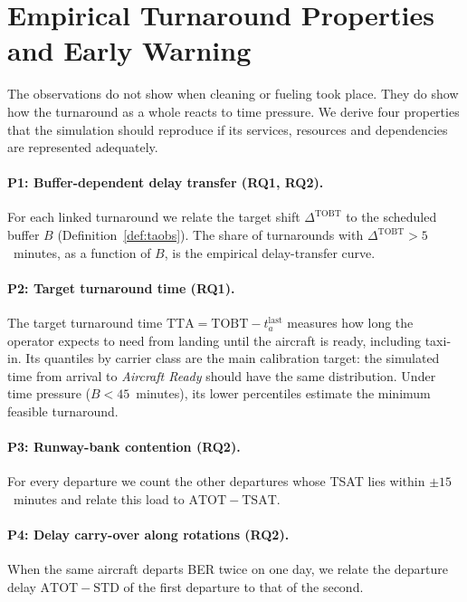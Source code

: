 \section{Empirical Turnaround Properties and Early Warning}
\label{sec:method-targets}

The observations do not show when cleaning or fueling took place. They do show how the turnaround as a whole reacts to time pressure. We derive four properties that the simulation should reproduce if its services, resources and dependencies are represented adequately.

\paragraph{P1: Buffer-dependent delay transfer (RQ1, RQ2).}
For each linked turnaround we relate the target shift $\Delta^{\mathrm{TOBT}}$ to the scheduled buffer $B$ (Definition~\ref{def:taobs}). The share of turnarounds with $\Delta^{\mathrm{TOBT}}>5$~minutes, as a function of $B$, is the empirical delay-transfer curve.

\paragraph{P2: Target turnaround time (RQ1).}
The target turnaround time $\mathrm{TTA}=\mathrm{TOBT}-t^{\mathrm{last}}_a$ measures how long the operator expects to need from landing until the aircraft is ready, including taxi-in. Its quantiles by carrier class are the main calibration target: the simulated time from arrival to \emph{Aircraft Ready} should have the same distribution. Under time pressure ($B<45$~minutes), its lower percentiles estimate the minimum feasible turnaround.

\paragraph{P3: Runway-bank contention (RQ2).}
For every departure we count the other departures whose TSAT lies within $\pm15$~minutes and relate this load to $\mathrm{ATOT}-\mathrm{TSAT}$.

\paragraph{P4: Delay carry-over along rotations (RQ2).}
When the same aircraft departs BER twice on one day, we relate the departure delay $\mathrm{ATOT}-\mathrm{STD}$ of the first departure to that of the second.

